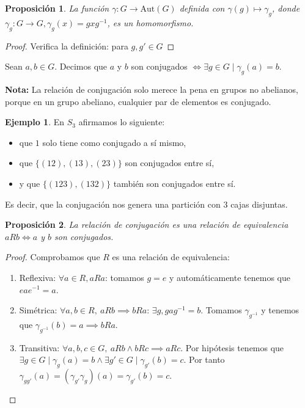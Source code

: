 \documentclass{book}
\newtheorem{pro}{Proposición}
\theoremstyle{definition}
\newtheorem{ej}{Ejemplo}
\theoremstyle{remark}
\newcommand{\inv}[1]{#1^{-1}}
\newcommand{\autom}[1]{\text{Aut}(#1)}
\begin{document}
\begin{pro}
	La función $\gamma: G \to \autom{G}$ definida con $\gamma(g) \mapsto \gamma_g$, donde $\gamma_g : G \to G, \gamma_g(x) = gx\inv{g}$, es un homomorfismo.
\end{pro}

\begin{proof}
	Verifica la definición: para $g,g' \in G$
\end{proof}

\begin{dfn}
	\label{dfn:elementosconjugados}
	Sean $a,b \in G$. Decimos que $a$ y $b$ son conjugados $\iff \exists g \in G \mid \gamma_g(a) = b$.
\end{dfn}

\textbf{Nota:} La relación de conjugación solo merece la pena en grupos no abelianos, porque en un grupo abeliano, cualquier par de elementos es conjugado.

\begin{ej}
	En $S_3$ afirmamos lo siguiente:
	\begin{itemize}
		\item que $1$ solo tiene como conjugado a sí mismo,
		\item que $\{(12),(13),(23)\}$ son conjugados entre sí,
		\item y que $\{(123),(132)\}$ también son conjugados entre sí.
	\end{itemize}
	Es decir, que la conjugación nos genera una partición con 3 cajas disjuntas.
\end{ej}

\begin{pro}
	La relación de conjugación es una relación de equivalencia $aRb \iff a$ y $b$ son conjugados.
\end{pro}

\begin{proof}
	Comprobamos que $R$ es una relación de equivalencia:
	\begin{enumerate}
		\item Reflexiva: $\forall a \in R, aRa$: tomamos $g = e$ y automáticamente tenemos que $ea\inv{e} = a$.
		\item Simétrica: $\forall a,b \in R,\ aRb \implies bRa$: $\exists g, g a \inv{g} = b$. Tomamos $\gamma_{\inv{g}}$ y tenemos que $\gamma_{\inv{g}}(b) = a \implies bRa$.
		\item Transitiva: $\forall a,b,c \in G,\ aRb \land bRc \implies aRc$. Por hipótesis tenemos que $\exists g \in G \mid \gamma_g(a) = b \land \exists g' \in G \mid \gamma_{g'}(b) = c$. Por tanto $\gamma_{gg'}(a) = (\gamma_{g'} \gamma_g)(a) = \gamma_{g'}(b) = c$.
	\end{enumerate}
\end{proof}
\end{document}
